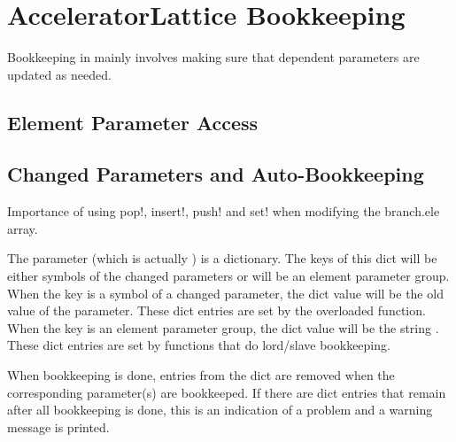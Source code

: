 \chapter{AcceleratorLattice Bookkeeping}
\label{c:bookkeeping}

Bookkeeping in \accellat mainly involves making sure that dependent parameters are updated as needed.

\section{Element Parameter Access}
\label{s:access}

\section{Changed Parameters and Auto-Bookkeeping}
\label{s:changed.param}

Importance of using pop!, insert!, push! and set! when modifying the branch.ele array.

The  parameter (which is actually ) is a dictionary.
The keys of this dict will be either symbols of the changed parameters or
will be an element parameter group. 
When the key is a symbol of a changed parameter,
the dict value will be the old value of the parameter. These dict entries are set by the 
overloaded  function. 
When the key is an element parameter group, the dict value will be the string .
These dict entries are set by functions that do lord/slave bookkeeping.

When bookkeeping is done, entries from the  dict are removed when the corresponding
parameter(s) are bookkeeped. If there are dict entries that remain after all bookkeeping is done,
this is an indication of a problem and a warning message is printed.

